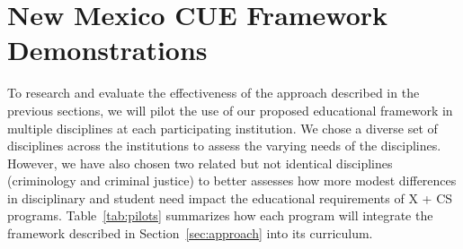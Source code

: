 \section{New Mexico CUE Framework Demonstrations}
\label{sec:pilots}

To research and evaluate the effectiveness of the approach described in the previous sections, we will pilot the use of our proposed educational framework in multiple disciplines at each participating institution. We chose a diverse set of disciplines across the institutions to assess the varying needs of the disciplines. However, we have also chosen two related but not identical disciplines (criminology and criminal justice) to better assesses how more modest differences in disciplinary and student need impact the educational requirements of X + CS programs. 
Table~\ref{tab:pilots} summarizes how each program will integrate the framework described in Section~\ref{sec:approach} into its curriculum. 
